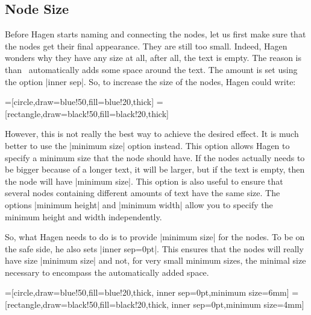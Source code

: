 \subsection{Node Size}

Before Hagen starts naming and connecting the nodes, let us first
make sure that the nodes get their final appearance. They are still
too small. Indeed, Hagen wonders why they have any size at all, after
all, the text is empty. The reason is than \tikzname\ automatically
adds some space around the text. The amount is set using the option
|inner sep|. So, to increase the size of the nodes, Hagen could write:

\begin{codeexample}[]
=[circle,draw=blue!50,fill=blue!20,thick]
=[rectangle,draw=black!50,fill=black!20,thick]
\end{codeexample}

However, this is not really the best way to achieve the desired
effect. It is much better to use the |minimum size| option
instead. This option allows Hagen to specify a minimum size that the
node should have. If the nodes actually needs to be bigger because of
a longer text, it will be larger, but if the text is empty, then the
node will have |minimum size|. This option is also useful to ensure
that several nodes containing different amounts of text have the same
size. The options |minimum height| and |minimum width| allow you to
specify the minimum height and width independently. 

So, what Hagen needs to do is to provide |minimum size| for the
nodes. To be on the safe side, he also sets |inner sep=0pt|. This
ensures that the nodes will really have size |minimum size| and not,
for very small minimum sizes, the minimal size necessary to encompass
the automatically added space.

\begin{codeexample}[]
=[circle,draw=blue!50,fill=blue!20,thick,
                   inner sep=0pt,minimum size=6mm]
=[rectangle,draw=black!50,fill=black!20,thick,
                        inner sep=0pt,minimum size=4mm]
\end{codeexample}




